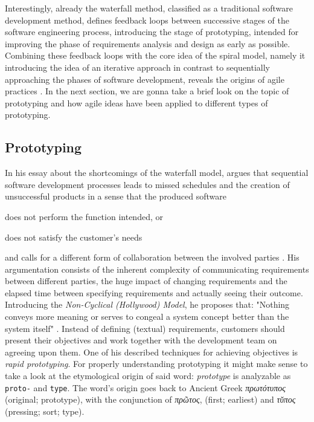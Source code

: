 
Interestingly, already the waterfall method\addref, classified as a traditional software development method, defines feedback loops between successive stages of the software engineering process, introducing the stage of prototyping, intended for improving the phase of requirements analysis and design as early as possible.
Combining these feedback loops with the core idea of the spiral model\addref, namely it introducing the idea of an iterative approach in contrast to sequentially approaching the phases of software development, reveals the origins of agile practices \cite{misra_agile_2012}.
In the next section, we are gonna take a brief look on the topic of prototyping and how agile ideas have been applied to different types of prototyping.


\subsection{Prototyping}
In his essay  about the shortcomings of the waterfall model, \citeauthor{gladden_stop_1982} argues that sequential software development processes leads to missed schedules and the creation of unsuccessful products in a sense that the produced software \begin{enumerate*}[label=(\roman*)]
\item does not perform the function intended, or
\item does not satisfy the customer's needs
\end{enumerate*}
and calls for a different form of collaboration between the involved parties \cite{gladden_stop_1982}.
His argumentation consists of the inherent complexity of communicating requirements between different parties, the huge impact of changing requirements and the elapsed time between specifying requirements and actually seeing their outcome.
Introducing the \emph{Non-Cyclical (Hollywood) Model}, he proposes that: "Nothing conveys more meaning or serves to congeal a system concept better than the system itself" \cite{gladden_stop_1982}.
Instead of defining (textual) requirements, customers should present their objectives and work together with the development team on agreeing upon them.
One of his described techniques for achieving objectives is \emph{rapid prototyping}.
For properly understanding prototyping it might make sense to take a look at the etymological origin of said word: \emph{prototype} is analyzable as \texttt{proto-} and \texttt{type}.
The word's origin goes back to Ancient Greek \emph{\textgreek{πρωτότυπος}} (original; prototype), with the conjunction of \emph{\textgreek{πρῶτος}}, (first; earliest) and \emph{\textgreek{τῠπος}} (pressing; sort; type). %

